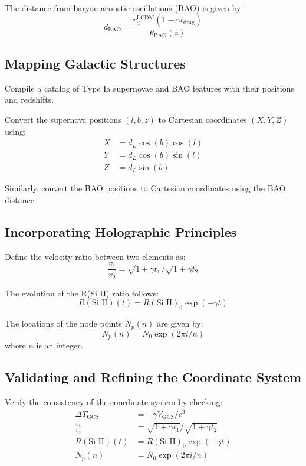 \documentclass{article}
\begin{document}
The distance from baryon acoustic oscillations (BAO) is given by:
\begin{equation}
d_\text{BAO} = \frac{r_d^{\text{LCDM}} \left(1 - \gamma t_\text{drag}\right)}{\theta_\text{BAO}(z)}
\end{equation}

\subsection*{Mapping Galactic Structures}

Compile a catalog of Type Ia supernovae and BAO features with their positions and redshifts.

Convert the supernova positions $(l, b, z)$ to Cartesian coordinates $(X, Y, Z)$ using:
\begin{align}
X &= d_L \cos(b) \cos(l) \\
Y &= d_L \cos(b) \sin(l) \\
Z &= d_L \sin(b)
\end{align}

Similarly, convert the BAO positions to Cartesian coordinates using the BAO distance.

\subsection*{Incorporating Holographic Principles}

Define the velocity ratio between two elements as:
\begin{equation}
\frac{v_1}{v_2} = \sqrt{1 + \gamma t_1} / \sqrt{1 + \gamma t_2}
\end{equation}

The evolution of the R(Si II) ratio follows:
\begin{equation}
R(\text{Si II})(t) = R(\text{Si II})_0 \exp(-\gamma t)
\end{equation}

The locations of the node points $N_p(n)$ are given by:
\begin{equation}
N_p(n) = N_0 \exp(2\pi i /n)
\end{equation}
where $n$ is an integer.

\subsection*{Validating and Refining the Coordinate System}

Verify the consistency of the coordinate system by checking:
\begin{align}
\Delta T_\text{GCS} &= -\gamma V_\text{GCS} / c^3 \\
\frac{v_1}{v_2} &= \sqrt{1 + \gamma t_1} / \sqrt{1 + \gamma t_2} \\
R(\text{Si II})(t) &= R(\text{Si II})_0 \exp(-\gamma t) \\
N_p(n) &= N_0 \exp(2\pi i /n)
\end{align}
\end{document}
